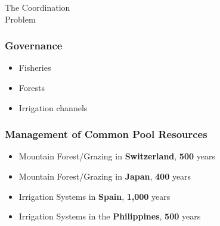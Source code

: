\documentclass[18pt]{beamer}
\begin{document}
{
\color{white}
\begin{frame}[plain]
\fontsize{36pt}{36pt}\selectfont
\center
\begin{center}
The Coordination\\
Problem\\
\end{center}
\end{frame}
}


{
\begin{frame}[plain]
\end{frame}
}


\begin{frame}
\frametitle{Governance}
\Huge
\begin{itemize}
\item Fisheries
\pause
\item Forests
\pause
\item Irrigation channels
\end{itemize}
\end{frame}


\begin{frame}
\frametitle{Management of Common Pool Resources}
\Large
\begin{itemize}
\item Mountain Forest/Grazing in \textbf{Switzerland}, \textbf{500} years
\pause
\item Mountain Forest/Grazing in \textbf{Japan}, \textbf{400} years
\pause
\item Irrigation Systems in \textbf{Spain}, \textbf{1,000} years
\pause
\item Irrigation Systems in the \textbf{Philippines}, \textbf{500} years
\end{itemize}
\end{frame}
\end{document}
